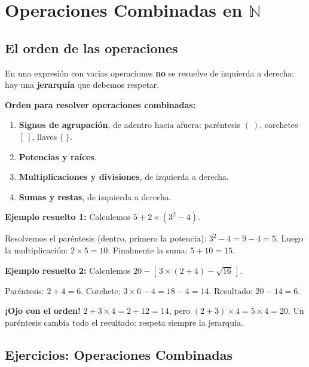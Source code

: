 \documentclass[12pt, letterpaper]{article}
\newcommand{\N}{\mathbb{N}}
\begin{document}
\newpage

\section{Operaciones Combinadas en $\N$}

\subsection{El orden de las operaciones}

En una expresión con varias operaciones \textbf{no} se resuelve de izquierda a derecha: hay una \textbf{jerarquía} que debemos respetar.

\begin{cuadroteoria}
  \textbf{Orden para resolver operaciones combinadas:}
  \begin{enumerate}[leftmargin=*]
    \item \textbf{Signos de agrupación}, de adentro hacia afuera: paréntesis $(\ )$, corchetes $[\ ]$, llaves $\{\ \}$.
    \item \textbf{Potencias y raíces}.
    \item \textbf{Multiplicaciones y divisiones}, de izquierda a derecha.
    \item \textbf{Sumas y restas}, de izquierda a derecha.
  \end{enumerate}
\end{cuadroteoria}

\noindent\textbf{Ejemplo resuelto 1:} Calculemos $5 + 2 \times (3^2 - 4)$.

Resolvemos el paréntesis (dentro, primero la potencia): $3^2 - 4 = 9 - 4 = 5$. Luego la multiplicación: $2 \times 5 = 10$. Finalmente la suma: $5 + 10 = 15$.

\noindent\textbf{Ejemplo resuelto 2:} Calculemos $20 - [\,3 \times (2 + 4) - \sqrt{16}\,]$.

Paréntesis: $2 + 4 = 6$. Corchete: $3 \times 6 - 4 = 18 - 4 = 14$. Resultado: $20 - 14 = 6$.

\begin{cuadroadvertencia}
  \textbf{¡Ojo con el orden!} $2 + 3 \times 4 = 2 + 12 = 14$, pero $(2 + 3) \times 4 = 5 \times 4 = 20$. Un paréntesis cambia todo el resultado: respeta siempre la jerarquía.
\end{cuadroadvertencia}

\subsection{Ejercicios: Operaciones Combinadas}
\end{document}
